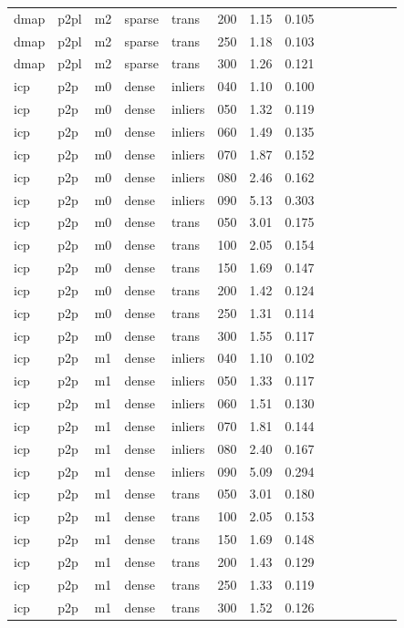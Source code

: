 \begin{table}[htbp]
\begin{tabular}{llllllrrrrrrrr}
  dmap & p2pl & m2 & sparse & trans & 200 & 1.15 & 0.105 \\
  dmap & p2pl & m2 & sparse & trans & 250 & 1.18 & 0.103 \\
  dmap & p2pl & m2 & sparse & trans & 300 & 1.26 & 0.121 \\
  icp & p2p & m0 & dense & inliers & 040 & 1.10 & 0.100 \\
  icp & p2p & m0 & dense & inliers & 050 & 1.32 & 0.119 \\
  icp & p2p & m0 & dense & inliers & 060 & 1.49 & 0.135 \\
  icp & p2p & m0 & dense & inliers & 070 & 1.87 & 0.152 \\
  icp & p2p & m0 & dense & inliers & 080 & 2.46 & 0.162 \\
  icp & p2p & m0 & dense & inliers & 090 & 5.13 & 0.303 \\
  icp & p2p & m0 & dense & trans & 050 & 3.01 & 0.175 \\
  icp & p2p & m0 & dense & trans & 100 & 2.05 & 0.154 \\
  icp & p2p & m0 & dense & trans & 150 & 1.69 & 0.147 \\
  icp & p2p & m0 & dense & trans & 200 & 1.42 & 0.124 \\
  icp & p2p & m0 & dense & trans & 250 & 1.31 & 0.114 \\
  icp & p2p & m0 & dense & trans & 300 & 1.55 & 0.117 \\
  icp & p2p & m1 & dense & inliers & 040 & 1.10 & 0.102 \\
  icp & p2p & m1 & dense & inliers & 050 & 1.33 & 0.117 \\
  icp & p2p & m1 & dense & inliers & 060 & 1.51 & 0.130 \\
  icp & p2p & m1 & dense & inliers & 070 & 1.81 & 0.144 \\
  icp & p2p & m1 & dense & inliers & 080 & 2.40 & 0.167 \\
  icp & p2p & m1 & dense & inliers & 090 & 5.09 & 0.294 \\
  icp & p2p & m1 & dense & trans & 050 & 3.01 & 0.180 \\
  icp & p2p & m1 & dense & trans & 100 & 2.05 & 0.153 \\
  icp & p2p & m1 & dense & trans & 150 & 1.69 & 0.148 \\
  icp & p2p & m1 & dense & trans & 200 & 1.43 & 0.129 \\
  icp & p2p & m1 & dense & trans & 250 & 1.33 & 0.119 \\
  icp & p2p & m1 & dense & trans & 300 & 1.52 & 0.126 \\

\end{tabular}
\end{table}
